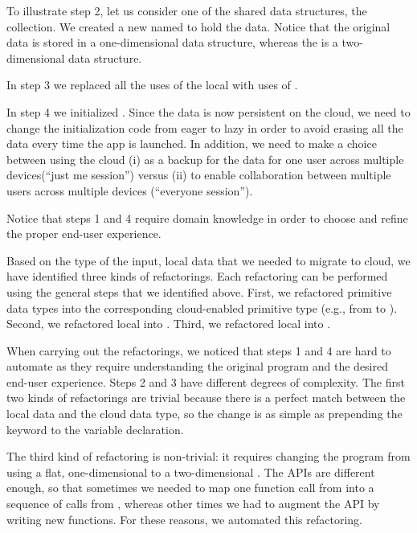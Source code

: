\documentclass{sigplanconf}
\begin{document}
To illustrate step 2, let us consider one of the shared data structures, the  collection. 
We created a new  named  to hold the data. Notice that the
original data is stored in a one-dimensional data structure, whereas the  is a two-dimensional data 
structure.

In step 3 we replaced all the uses of the local  with uses of . 

In step 4 we initialized  . 
Since the data is now persistent on the cloud, we need to change the initialization code from 
eager to lazy in order to avoid erasing all the data every time the app is launched.  
In addition, we need to make a choice between using the cloud (i) as a backup for the data for one user across multiple devices(``just me session'') versus (ii) to enable collaboration between multiple users across multiple devices (``everyone session'').

Notice that steps 1 and 4 require domain knowledge in order to choose and refine the proper end-user experience.  
 
Based on the type of the input, local data that we needed to migrate to cloud, we have identified three kinds of refactorings. Each refactoring can be performed using the general steps that we identified above. First, we refactored primitive data 
types into the corresponding cloud-enabled primitive type (e.g., from  to ).
Second, we refactored local  into . Third, we refactored local 
into .

When carrying out the refactorings, we noticed that steps 1 and 4 are hard to automate as they require understanding the original program and the desired end-user experience. Steps 2 and 3 have different degrees of complexity. 
The first two kinds of refactorings  are trivial because there is a perfect match between the local data and the cloud data type, so the change is as simple as prepending the keyword  to the variable declaration. 

The third kind of refactoring is non-trivial: it requires changing the program from using a flat, one-dimensional  to a two-dimensional  . The APIs are different enough, so that sometimes we needed to map one function call from  into a sequence of calls from , whereas other times we had to augment the API by writing new functions. 
For these reasons, we automated this refactoring. 
\end{document}
